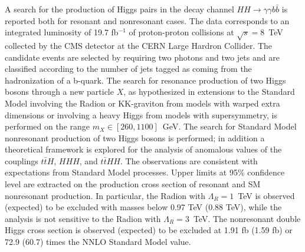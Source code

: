 A search for the production of Higgs pairs in the decay channel
$HH \rightarrow \gamma\gamma b\bar{b}$ is reported both for
resonant and nonresonant cases. The data corresponds to an integrated
luminosity of 19.7 fb$^{-1}$ of proton-proton collisions at $\sqrt{s}=8$~TeV collected by the
CMS detector at the CERN Large Hardron Collider.
The candidate events are selected by requiring two photons and two jets and are classified
according to the number of jets tagged as coming from the hadronization of a b-quark.
The search for resonance production of two Higgs bosons
through a new particle $X$, as hypothesized in extensions
to the Standard Model involving the Radion or KK-graviton from models with warped extra dimensions
or involving a heavy Higgs from models with supersymmetry,
is performed on the range $m_X \in [260, 1100]$~GeV.
The search for Standard Model nonresonant production of two Higgs bosons
is performed; in addition
a theoretical framework is explored for the analysis of anomalous values of the couplings
$t\bar{t}H$, $HHH$, and $t\bar{t}HH$.
The observations are consistent with expectations from Standard Model processes.
Upper limits at 95\% confidence level are extracted on the production cross section
of resonant and SM nonresonant production.
In particular, the Radion with $\Lambda_R = 1$~TeV is observed (expected) to be excluded with masses
below 0.97 TeV (0.88 TeV), while the analysis is not sensitive to the Radion with $\Lambda_R = 3$~TeV.
The nonresonant double Higgs cross section is observed (expected) to be excluded at
1.91 fb (1.59 fb) or 72.9 (60.7) times the NNLO Standard Model value.
